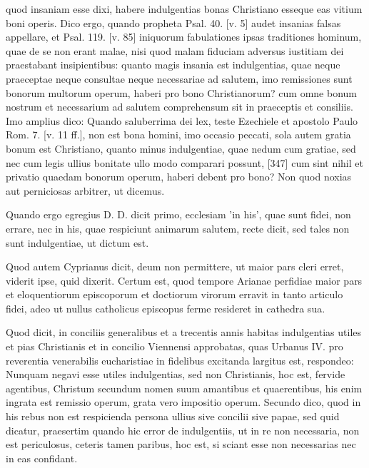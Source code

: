 quod insaniam esse dixi, habere indulgentias bonas Christiano esseque eas vitium boni operis. Dico ergo, quando propheta Psal. 40. [v. 5] audet insanias falsas appellare, et Psal. 119. [v. 85] iniquorum fabulationes ipsas traditiones hominum, quae de se non erant malae, nisi quod malam fiduciam adversus iustitiam dei praestabant insipientibus: quanto magis insania est indulgentias, quae neque praeceptae neque consultae neque necessariae ad salutem, imo remissiones sunt bonorum multorum operum, haberi pro bono Christianorum? cum omne bonum nostrum et necessarium ad salutem comprehensum sit in praeceptis et consiliis. Imo amplius dico: Quando saluberrima dei lex, teste Ezechiele et apostolo Paulo Rom. 7. [v. 11 ff.], non est bona homini, imo occasio peccati, sola autem gratia bonum est Christiano, quanto minus indulgentiae, quae nedum cum gratiae, sed nec cum legis ullius bonitate ullo modo comparari possunt, [347] cum sint nihil et privatio quaedam bonorum operum, haberi debent pro bono? Non quod noxias aut perniciosas arbitrer, ut dicemus.

Quando ergo egregius D. D. dicit primo, ecclesiam 'in his', quae sunt fidei, non errare, nec in his, quae respiciunt animarum salutem, recte dicit, sed tales non sunt indulgentiae, ut dictum est.

Quod autem Cyprianus dicit, deum non permittere, ut maior pars cleri erret, viderit ipse, quid dixerit. Certum est, quod tempore Arianae perfidiae maior pars et eloquentiorum episcoporum et doctiorum virorum erravit in tanto articulo fidei, adeo ut nullus catholicus episcopus ferme resideret in cathedra sua.

Quod dicit, in conciliis generalibus et a trecentis annis habitas indulgentias utiles et pias Christianis et in concilio Viennensi approbatas, quas Urbanus IV. pro reverentia venerabilis eucharistiae in fidelibus excitanda largitus est, respondeo: Nunquam negavi esse utiles indulgentias, sed non Christianis, hoc est, fervide agentibus, Christum secundum nomen suum amantibus et quaerentibus, his enim ingrata est remissio operum, grata vero impositio operum. Secundo dico, quod in his rebus non est respicienda persona ullius sive concilii sive papae, sed quid dicatur, praesertim quando hic error de indulgentiis, ut in re non necessaria, non est periculosus, ceteris tamen paribus, hoc est, si sciant esse non necessarias nec in eas confidant.

